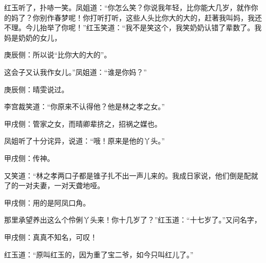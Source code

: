 \begin{parag}
    红玉听了，扑哧一笑。凤姐道：“你怎么笑？你说我年轻，比你能大几岁，就作你的妈了？你别作春梦呢！你打听打听，这些人头比你大的大的，赶著我叫妈，我还不理。今儿抬举了你呢！”红玉笑道：“我不是笑这个，我笑奶奶认错了辈数了。我妈是奶奶的女儿，\begin{note}庚辰侧：所以说“比你大的大的”。\end{note}这会子又认我作女儿。”凤姐道：“谁是你妈？”\begin{note}庚辰侧：晴雯说过。\end{note}李宫裁笑道：“你原来不认得他？他是林之孝之女。”\begin{note}甲戌侧：管家之女，而晴卿辈挤之，招祸之媒也。\end{note}凤姐听了十分诧异，说道：“哦！原来是他的丫头。”\begin{note}甲戌侧：传神。\end{note}又笑道：“林之孝两口子都是锥子扎不出一声儿来的。我成日家说，他们倒是配就了的一对夫妻，一对天聋地哑。\begin{note}甲戌侧：用的是阿凤口角。\end{note}那里承望养出这么个伶俐丫头来！你十几岁了？”红玉道：“十七岁了。”又问名字，\begin{note}甲戌侧：真真不知名，可叹！\end{note}红玉道：“原叫红玉的，因为重了宝二爷，如今只叫红儿了。”
\end{parag}


